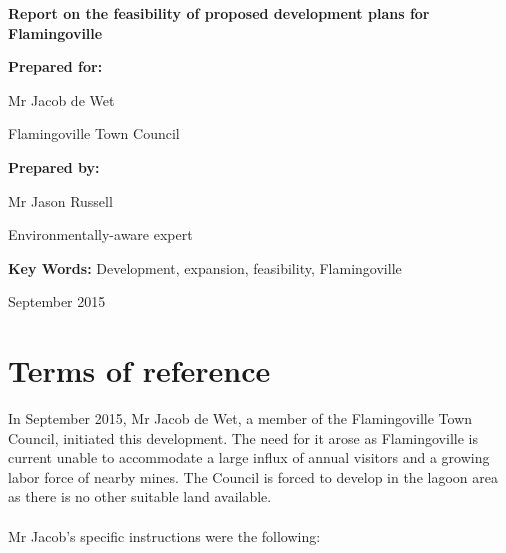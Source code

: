 \documentclass{article}
\begin{document}
\begin{titlepage}
	\begin{center}
		\vspace*{1cm}
		
		\textbf{Report on the feasibility of proposed development plans for Flamingoville}
		
		\vspace{1.5cm}
		
		\textbf{Prepared for:}
		
		Mr Jacob de Wet
		
		Flamingoville Town Council
		
		\vspace{1.5cm}
		
		\textbf{Prepared by:}
		
		Mr Jason Russell
		
		Environmentally-aware expert
		
		\vspace{1.5cm}

		\textbf{Key Words:}
		Development, expansion, feasibility, Flamingoville
		
		\vspace{1.5cm}
		September 2015
		
	\end{center}
\end{titlepage}
\thispagestyle{empty}

\setcounter{page}{0}

\newpage
\section*{Terms of reference}
In September 2015, Mr Jacob de Wet, a member of the Flamingoville Town Council, initiated this development. The need for it arose as Flamingoville is current unable to accommodate a large influx of annual visitors and a growing labor force of nearby mines. The Council is forced to develop in the lagoon area as there is no other suitable land available.

\paragraph{}

Mr Jacob's specific instructions were the following:
\end{document}
